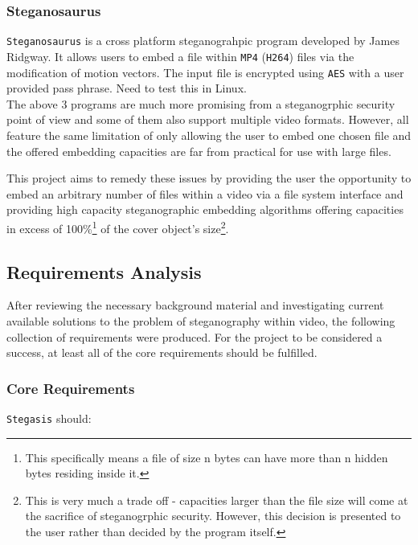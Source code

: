 \documentclass[paper=a4, fontsize=11pt,twoside]{scrartcl}    %
\numberwithin{table}{section}
\numberwithin{figure}{section}
\numberwithin{algorithm}{section}
\begin{document}
\subsubsection{Steganosaurus}

\texttt{Steganosaurus} is a cross platform steganograhpic program developed by James Ridgway. It allows users to embed a file within \texttt{MP4} (\texttt{H264}) files via the modification of motion vectors. The input file is encrypted using \texttt{AES} with a user provided pass phrase. Need to test this in Linux.\\

\noindent
The above 3 programs are much more promising from a steganogrphic security point of view and some of them also support multiple video formats. However, all feature the same limitation of only allowing the user to embed one chosen file and the offered embedding capacities are far from practical for use with large files.

This project aims to remedy these issues by providing the user the opportunity to embed an arbitrary number of files within a video via a file system interface and providing high capacity steganographic embedding algorithms offering capacities in excess of 100\%\footnote{This specifically means a file of size n bytes can have more than n hidden bytes residing inside it.} of the cover object's size\footnote{This is very much a trade off - capacities larger than the file size will come at the sacrifice of steganogrphic security. However, this decision is presented to the user rather than decided by the program itself.}. 

\subsection{Requirements Analysis}

After reviewing the necessary background material and investigating current available solutions to the problem of steganography within video, the following collection of requirements were produced. For the project to be considered a success, at least all of the core requirements should be fulfilled.

\subsubsection{Core Requirements}

\texttt{Stegasis} should:
\end{document}
